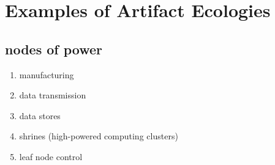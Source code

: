 \section{Examples of Artifact Ecologies}
\label{sec:artifact_ecologies}
%
\subsection{nodes of power}
        \begin{enumerate}
            \item manufacturing
            \item data transmission
            \item data stores
            \item shrines (high-powered computing clusters)
            \item leaf node control
        \end{enumerate}        


